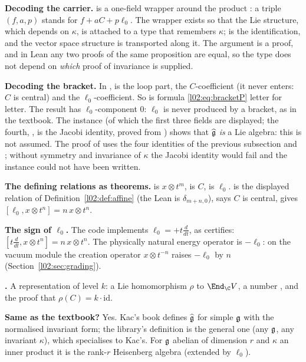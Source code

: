 \begin{dictionary}
\textbf{Decoding the carrier.}  is a one-field wrapper around the product
: a triple $(f,a,p)$ stands for $f + aC + p\ell_0$. The wrapper exists so
that the Lie structure, which depends on $\kappa$, is attached to a type that remembers $\kappa$;
 is the identification, and the vector space structure is transported along it. The
argument  is a proof, and in Lean any two proofs of the same proposition are equal, so
the type does not depend on \emph{which} proof of invariance is supplied.

\textbf{Decoding the bracket.} In ,  is the loop part,  the
$C$-coefficient (it never enters: $C$ is central) and  the $\ell_0$-coefficient. So
 is formula \eqref{l02:eq:bracketP} letter for letter. The result has $\ell_0$-component
$0$: $\ell_0$ is never produced by a bracket, as in the textbook. The  instance
(of which the first three fields are displayed; the fourth, , is the Jacobi
identity, proved from ) shows that $\widehat{\mathfrak{g}}$ \emph{is} a Lie algebra: this is
not assumed. The proof of  uses the four identities of the previous
subsection and ; without symmetry and invariance of $\kappa$ the Jacobi identity would fail
and the instance could not have been written.

\textbf{The defining relations as theorems.}  is $x\otimes t^m$, 
is $C$,  is $\ell_0$.  is the displayed relation of
Definition~\ref{l02:def:affine} (the Lean  is
$\delta_{m+n,0}$),  says $C$ is central,  gives
$[\ell_0,x\otimes t^n] = n\,x\otimes t^n$.

\textbf{The sign of $\ell_0$.} The code implements $\ell_0 = +t\frac{d}{dt}$, as 
certifies: $[t\frac{d}{dt}, x\otimes t^n] = n\,x\otimes t^n$. The physically natural energy operator is $-\ell_0$: on the vacuum module
the creation operator $x\otimes t^{-n}$ raises $-\ell_0$ by $n$ (Section~\ref{l02:sec:grading}).

\textbf{.} A representation of level $k$: a Lie homomorphism $\rho$ to
$\End_\C V$, a number , and the proof that $\rho(C) = k\cdot\mathrm{id}$.

\textbf{Same as the textbook?} Yes. Kac's book defines $\widehat{\mathfrak{g}}$ for simple $\mathfrak{g}$ with the
normalised invariant form; the library's definition is the general one (any $\mathfrak{g}$, any invariant
$\kappa$), which specialises to Kac's. For $\mathfrak{g}$ abelian of dimension $r$ and $\kappa$ an inner
product it is the rank-$r$ Heisenberg algebra (extended by $\ell_0$).
\end{dictionary}

